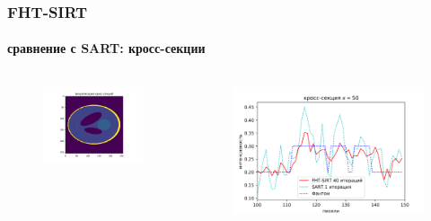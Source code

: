 \documentclass[12pt]{beamer}
\begin{document}
\begin{frame}
\frametitle{FHT-SIRT}
\framesubtitle{сравнение с SART: кросс-секции}
\begin{columns}[T,onlytextwidth]
  \hspace*{-1cm}
  \begin{column}{0.2\textwidth}
    \begin{figure}
      \centering
      \vspace{1.5cm}
      \includegraphics[width=1.5\textwidth]{cs_v_50_viz}
    \end{figure}
  \end{column}
  \begin{column}{0.8\textwidth}
    \begin{figure}
      \centering
      \vspace{-1cm}
      \includegraphics[width=1.2\textwidth]{cs_v_50}
    \end{figure}
  \end{column}
\end{columns}
\end{frame}
\end{document}
